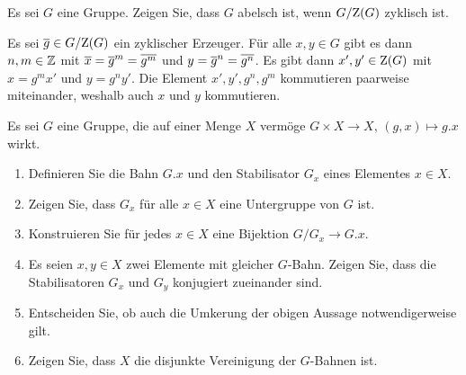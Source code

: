 \begin{question}
  Es sei $G$ eine Gruppe.
  Zeigen Sie, dass $G$ abelsch ist, wenn $G/{\operatorname{Z}(G)}$ zyklisch ist.
\end{question}


\begin{solution}
  Es sei $\overline{g} \in G/{\operatorname{Z}(G)}$ ein zyklischer Erzeuger.
  Für alle $x, y \in G$ gibt es dann $n, m \in \mathbb{Z}$ mit $\overline{x} = \overline{g}^m = \overline{g^m}$ und $y = \overline{g}^n = \overline{g^n}$.
  Es gibt dann $x', y' \in \operatorname{Z}(G)$ mit $x = g^m x'$ und $y = g^n y'$.
  Die Element $x', y', g^n, g^m$ kommutieren paarweise miteinander, weshalb auch $x$ und $y$ kommutieren.
\end{solution}


\begin{question}[subtitle = Grundbegriffe der Gruppenwirkungen]
  Es sei $G$ eine Gruppe, die auf einer Menge $X$ vermöge $G \times X \to X$, $(g,x) \mapsto g.x$ wirkt.
  \begin{enumerate}
    \item
      Definieren Sie die Bahn $G.x$ und den Stabilisator $G_x$ eines Elementes $x \in X$.
    \item
      Zeigen Sie, dass $G_x$ für alle $x \in X$ eine Untergruppe von $G$ ist.
    \item
      Konstruieren Sie für jedes $x \in X$ eine Bijektion $G/G_x \to G.x$.
    \item
      Es seien $x, y \in X$ zwei Elemente mit gleicher $G$-Bahn.
      Zeigen Sie, dass die Stabilisatoren $G_x$ und $G_y$ konjugiert zueinander sind.
    \item
      Entscheiden Sie, ob auch die Umkerung der obigen Aussage notwendigerweise gilt.
    \item
      Zeigen Sie, dass $X$ die disjunkte Vereinigung der $G$-Bahnen ist.
  \end{enumerate}
\end{question}


